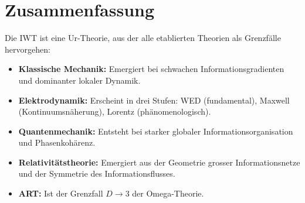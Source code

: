 \section{Zusammenfassung}

Die IWT ist eine Ur-Theorie, aus der alle etablierten Theorien als Grenzfälle hervorgehen:

\begin{itemize}
\item \textbf{Klassische Mechanik:} Emergiert bei schwachen Informationsgradienten und dominanter lokaler Dynamik.
\item \textbf{Elektrodynamik:} Erscheint in drei Stufen: WED (fundamental), Maxwell (Kontinuumsnäherung), Lorentz (phänomenologisch).
\item \textbf{Quantenmechanik:} Entsteht bei starker globaler Informationsorganisation und Phasenkohärenz.
\item \textbf{Relativitätstheorie:} Emergiert aus der Geometrie grosser Informationsnetze und der Symmetrie des Informationsflusses.
\item \textbf{ART:} Ist der Grenzfall \( D \to 3 \) der Omega-Theorie.
\end{itemize}